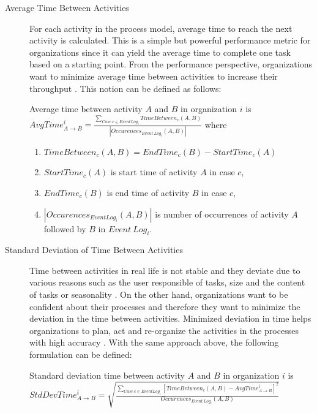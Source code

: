 \begin{description}
	\item[Average Time Between Activities] For each activity in the process model, average time to reach the next activity is calculated. This is a simple but powerful performance metric for organizations since it can yield the average time to complete one task based on a starting point. From the performance perspective, organizations want to minimize average time between activities to increase their throughput \cite{van2012replaying}. This notion can be defined as follows:
  \theoremstyle{definition}
  \begin{definition}{}
  Average time between activity $A$ and $B$ in organization $i$ is $AvgTime_{A\rightarrow B}^{i} = \frac{\sum_{Case\ c \in Event Log_{i}} TimeBetween_{c}(A,B)}{|Occurences_{Event\ Log_{i}}(A,B)|}$ where
    \begin{enumerate}
      \item $TimeBetween_{c}(A, B) = EndTime_{c}(B) - StartTime_{c}(A)$
      \item $StartTime_{c}(A)$ is start time of activity $A$ in case $c$,
      \item $EndTime_{c}(B)$ is end time of activity $B$ in case $c$,
      \item $|Occurences_{Event Log_{i}}(A, B)|$ is number of occurrences of activity $A$ followed by $B$ in  $Event\ Log_{i}$.
    \end{enumerate}
  \end{definition}
	\item[Standard Deviation of Time Between Activities] Time between activities in real life is not stable and they deviate due to various reasons such as the user responsible of tasks, size and the content of tasks or seasonality \cite{van2011process}. On the other hand, organizations want to be confident about their processes and therefore they want to minimize the deviation in the time between activities. Minimized deviation in time helps organizations to plan, act and re-organize the activities in the processes with high accuracy \cite{van2012replaying}. With the same approach above, the following formulation can be defined:
  \theoremstyle{definition}
  \begin{definition}{}
  Standard deviation time between activity $A$ and $B$ in organization $i$ is $StdDevTime_{A\rightarrow B}^{i} = \sqrt{\frac{\sum_{Case\ c \in Event Log_{i}} [TimeBetween_{c}(A, B) - AvgTime_{A\rightarrow B}^{i}]^{2}}{Occurences_{Event\ Log_{i}}(A,B)} }$ 
  \end{definition}
\end{description}

